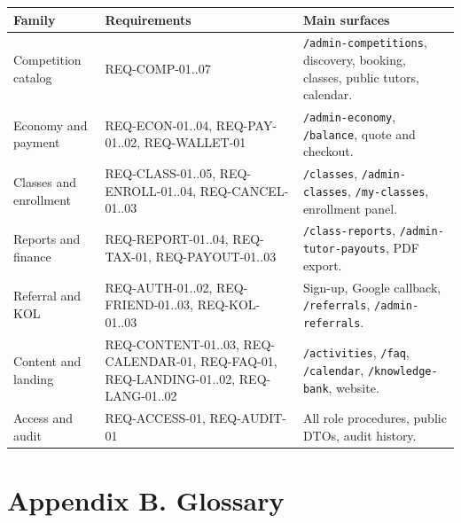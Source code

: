 \documentclass[11pt,a4paper]{article}
\newcommand{\code}[1]{\texttt{#1}}
\begin{document}
\begin{longtable}{@{}L{3.2cm}L{4.8cm}L{7.0cm}@{}}
\toprule
\textbf{Family} & \textbf{Requirements} & \textbf{Main surfaces} \\
\midrule
\endhead
Competition catalog & REQ-COMP-01..07 & \code{/admin-competitions}, discovery, booking, classes, public tutors, calendar. \\
Economy and payment & REQ-ECON-01..04, REQ-PAY-01..02, REQ-WALLET-01 & \code{/admin-economy}, \code{/balance}, quote and checkout. \\
Classes and enrollment & REQ-CLASS-01..05, REQ-ENROLL-01..04, REQ-CANCEL-01..03 & \code{/classes}, \code{/admin-classes}, \code{/my-classes}, enrollment panel. \\
Reports and finance & REQ-REPORT-01..04, REQ-TAX-01, REQ-PAYOUT-01..03 & \code{/class-reports}, \code{/admin-tutor-payouts}, PDF export. \\
Referral and KOL & REQ-AUTH-01..02, REQ-FRIEND-01..03, REQ-KOL-01..03 & Sign-up, Google callback, \code{/referrals}, \code{/admin-referrals}. \\
Content and landing & REQ-CONTENT-01..03, REQ-CALENDAR-01, REQ-FAQ-01, REQ-LANDING-01..02, REQ-LANG-01..02 & \code{/activities}, \code{/faq}, \code{/calendar}, \code{/knowledge-bank}, website. \\
Access and audit & REQ-ACCESS-01, REQ-AUDIT-01 & All role procedures, public DTOs, audit history. \\
\bottomrule
\end{longtable}

\section{Appendix B. Glossary}
\end{document}
